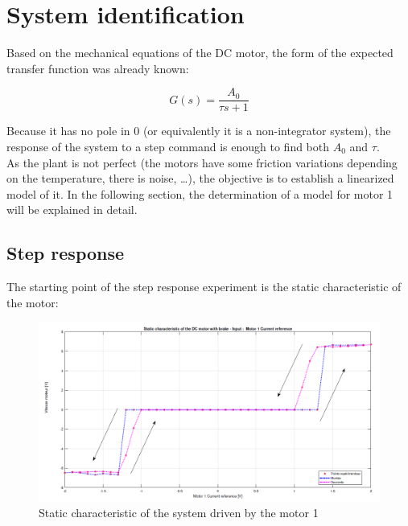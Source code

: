 \setcounter{secnumdepth}{2}

\chapter{System identification}
\label{section_identification}

Based on the mechanical equations of the DC motor, the form of the expected transfer function was already known:

\begin{equation}
    G(s) = \frac{A_0}{\tau s + 1}
    \label{1_st_order_TF}
\end{equation}

Because it has no pole in $0$ (or equivalently it is a non-integrator system), the response of the system to a step
command is enough to find both $A_0$ and $\tau$.\\

As the plant is not perfect (the motors have some friction variations depending on the temperature, there is noise, 
\dots), the objective is to establish a linearized model of it. In the following section, the determination of a
model for motor 1 will be explained in detail.

\section{Step response}

The starting point of the step response experiment is the static characteristic of the motor:

\begin{figure}[H]
    \centering
    \includegraphics[height=\textheight/4]{Pictures/static_characteristic_motor_1.png}
    \caption{Static characteristic of the system driven by the motor 1}
    \label{static_characteristic_motor_1}
\end{figure}

